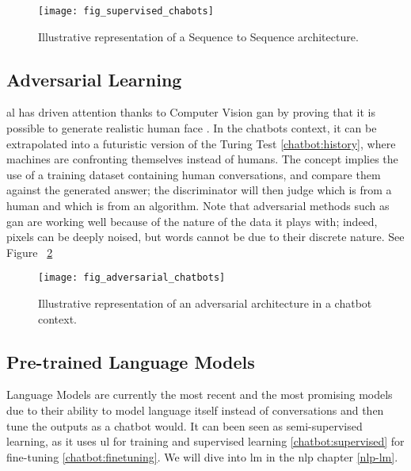 \begin{figure}
    \centering
    \texttt{[image: fig\_supervised\_chabots]}
    \caption{Illustrative representation of a Sequence to Sequence architecture.}
    \label{fig:fig_supervised_chabots}
\end{figure}

\subsection{Adversarial Learning}
\label{chatbot:adversarial}
\gls{al} has driven attention thanks to Computer Vision \gls{gan} \autocite{paper:Karras2019stylegan2} by proving that it is possible to generate realistic human face \autocite{website:person_does_not_exist}. In the chatbots context, it can be extrapolated into a futuristic version of the Turing Test \ref{chatbot:history}, where machines are confronting themselves instead of humans. The concept implies the use of a training dataset containing human conversations, and compare them against the generated answer; the discriminator will then judge which is from a human and which is from an algorithm. Note that adversarial methods such as \gls{gan} are working well because of the nature of the data it plays with; indeed, pixels can be deeply noised, but words cannot be due to their discrete nature. See Figure ~\ref{fig:fig_adversarial_chatbots} 

\begin{figure}
    \centering
    \texttt{[image: fig\_adversarial\_chatbots]}
    \caption{Illustrative representation of an adversarial architecture in a chatbot context.}
    \label{fig:fig_adversarial_chatbots}
\end{figure}

\subsection{Pre-trained Language Models}
Language Models are currently the most recent and the most promising models due to their ability to model language itself instead of conversations and then tune the outputs as a chatbot would. It can been seen as semi-supervised learning, as it uses \gls{ul} for training and supervised learning \ref{chatbot:supervised} for fine-tuning \ref{chatbot:finetuning}. We will dive into \gls{lm} in the \gls{nlp} chapter \ref{nlp-lm}.


